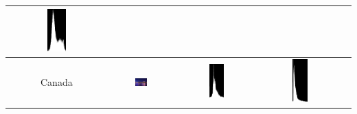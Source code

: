 \documentclass[12pt,a4paper]{article}
\begin{document}
\begin{center}
\begin{longtable}{|c|c|c|c|c|}
       \includegraphics[width=0.2\textwidth]{./latexSource/dog_R_HIS.png} \\ 
\hline
Canada & \includegraphics[width=0.2\textwidth]{./latexSource/Canada_origin.png} & 
       \includegraphics[width=0.2\textwidth]{./latexSource/Canada_B_HIS.png} & 
       \includegraphics[width=0.2\textwidth]{./latexSource/Canada_G_HIS.png} & 

\end{longtable}
\end{center}
\end{document}
